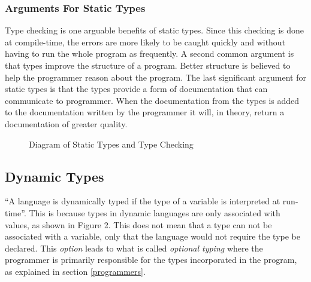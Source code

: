 \documentclass{sig-alternate}
\begin{document}
\subsubsection{Arguments For Static Types}\label{arguments}
Type checking is one arguable benefits of static types. Since this checking is done at compile-time, the errors are more likely to be caught quickly and without having to run the whole program as frequently. A second common argument is that types improve the structure of a program. Better structure is believed to help the programmer reason about the program. The last significant argument for static types is that the types provide a form of documentation that can communicate to programmer. When the documentation from the types is added to the documentation written by the programmer it will, in theory, return a documentation of greater quality.

\begin{figure}
\centering
{}
\caption{Diagram of Static Types and Type Checking \cite{Ferg2012}}
\end{figure}

\subsection{Dynamic Types} \label{dynamic}
``A language is dynamically typed if the type of a variable is interpreted at run-time''\cite{NomeN2009}. This is because types in dynamic languages are only associated with values\cite{Pierce2002}, as shown in Figure 2. This does not mean that a type can not be associated with a variable, only that the language would not require the type be declared. This \emph{option} leads to what is called \emph{optional typing} where the programmer is primarily  responsible for the types incorporated in the program, as explained in section \ref{programmers}. 
\end{document}
